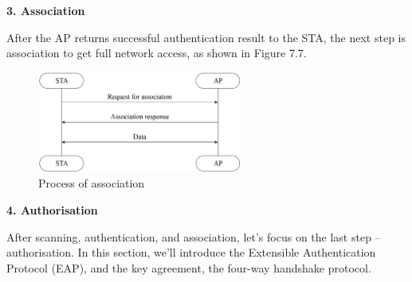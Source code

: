 \documentclass[a4paper,12pt,openany]{book}
\begin{document}
\textbf{3. Association}

After the AP returns successful authentication result to the STA, the next step is association to get full network access, as shown in Figure 7.7.

\begin{figure}[!h]
    \centering
    \includegraphics[width=0.6\textwidth]{D7Z/7-7}
    \caption{Process of association}
\end{figure}

\textbf{4. Authorisation}

After scanning, authentication, and association, let’s focus on the last step – authorisation. In this section, we’ll introduce the Extensible Authentication Protocol (EAP), and the key agreement, the four-way handshake protocol.
\end{document}

